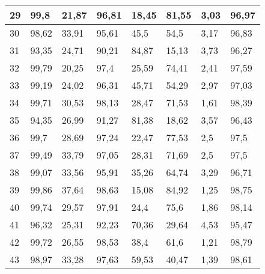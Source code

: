 \begin{longtable}[c]{|l|l|l|l|l|l|l|l|}
29              & 99,8         & 21,87        & 96,81       & 18,45         & 81,55         & 3,03          & 96,97         \\ \hline
30              & 98,62        & 33,91        & 95,61       & 45,5          & 54,5          & 3,17          & 96,83         \\ \hline
31              & 93,35        & 24,71        & 90,21       & 84,87         & 15,13         & 3,73          & 96,27         \\ \hline
32              & 99,79        & 20,25        & 97,4        & 25,59         & 74,41         & 2,41          & 97,59         \\ \hline
33              & 99,19        & 24,02        & 96,31       & 45,71         & 54,29         & 2,97          & 97,03         \\ \hline
34              & 99,71        & 30,53        & 98,13       & 28,47         & 71,53         & 1,61          & 98,39         \\ \hline
35              & 94,35        & 26,99        & 91,27       & 81,38         & 18,62         & 3,57          & 96,43         \\ \hline
36              & 99,7         & 28,69        & 97,24       & 22,47         & 77,53         & 2,5           & 97,5          \\ \hline
37              & 99,49        & 33,79        & 97,05       & 28,31         & 71,69         & 2,5           & 97,5          \\ \hline
38              & 99,07        & 33,56        & 95,91       & 35,26         & 64,74         & 3,29          & 96,71         \\ \hline
39              & 99,86        & 37,64        & 98,63       & 15,08         & 84,92         & 1,25          & 98,75         \\ \hline
40              & 99,74        & 29,57        & 97,91       & 24,4          & 75,6          & 1,86          & 98,14         \\ \hline
41              & 96,32        & 25,31        & 92,23       & 70,36         & 29,64         & 4,53          & 95,47         \\ \hline
42              & 99,72        & 26,55        & 98,53       & 38,4          & 61,6          & 1,21          & 98,79         \\ \hline
43              & 98,97        & 33,28        & 97,63       & 59,53         & 40,47         & 1,39          & 98,61         \\ \hline

\end{longtable}
